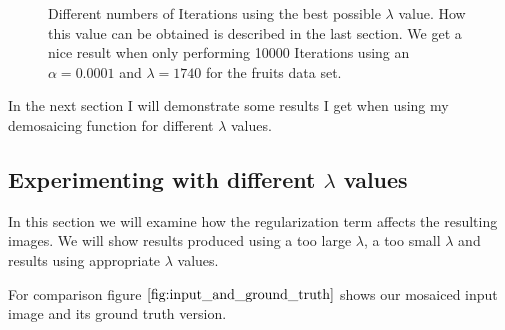 \documentclass{paper}
\begin{document}
\begin{figure}[h!]
\begin{center}
{   \label{fig:subfig1223}
 }
\end{center}
\caption{Different numbers of Iterations using the best possible $\lambda$ value. How this value can be obtained is described in the last section. We get a nice result when only performing 10000 Iterations using an $\alpha=0.0001$ and $\lambda = 1740$ for the fruits data set.}
\label{fig:different_iters_for_best_lambda}
\end{figure}

In the next section I will demonstrate some results I get when using my demosaicing function for different $\lambda$ values. 

\subsection{Experimenting with different $\lambda$ values}
In this section we will examine how the regularization term affects the resulting images. We will show results produced using a too large $\lambda$, a too small $\lambda$ and results using appropriate $\lambda$ values.

For comparison figure $\ref{fig:input_and_ground_truth}$ shows our mosaiced input image and its ground truth version.
\end{document}
